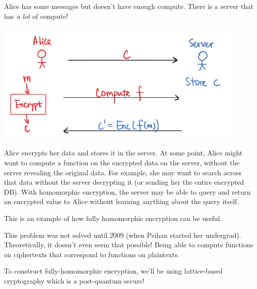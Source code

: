 \begin{example*}
    Alice has some messages but doesn't have enough compute. There is a server that has \emph{a lot} of compute!

    \begin{center}
        \includegraphics[width=0.9\textwidth]{images/2023-01-26/outsourced_computation.png}
    \end{center}

    Alice encrypts her data and stores it in the server. At some point, Alice might want to compute a function on the encrypted data on the server, without the server revealing the original data. For example, she may want to search across that data without the server decrypting it (or sending her the entire encrypted DB). With homomorphic encryption, the server may be able to query and return an encrypted value to Alice without learning anything about the query itself.

    This is an example of how fully homomorphic encryption can be useful.
\end{example*}

\begin{remark*}
    This problem was not solved until 2009 (when Peihan started her undergrad). Theoretically, it doesn't even seem that possible! Being able to compute functions on ciphertexts that correspond to functions on plaintexts.
\end{remark*}

To construct fully-homomorphic encryption, we'll be using lattice-based cryptography which is a post-quantum secure!

